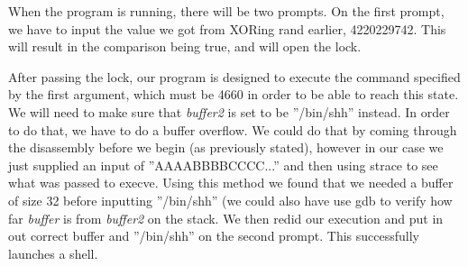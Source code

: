 When the program is running, there will be two prompts. On the first prompt, we have to input the value we got from XORing rand earlier, 4220229742. This will result in the comparison being true, and will open the lock.

After passing the lock, our program is designed to execute the command specified by the first argument, which must be 4660 in order to be able to reach this state. We will need to make sure that \emph{buffer2} is set to be ''/bin/shh'' instead. In order to do that, we have to do a buffer overflow. We could do that by coming through the disassembly before we begin (as previously stated), however in our case we just supplied an input of ''AAAABBBBCCCC...'' and then using strace to see what was passed to execve. Using this method we found that we needed a buffer of size 32 before inputting ''/bin/shh'' (we could also have use gdb to verify how far \emph{buffer} is from \emph{buffer2} on the stack. We then redid our execution and put in out correct buffer and ''/bin/shh'' on the second prompt. This successfully launches a shell.
